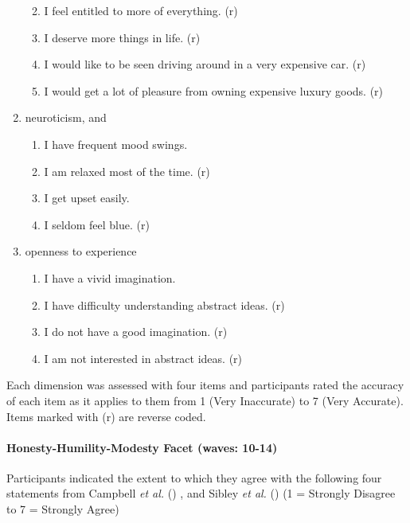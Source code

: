 \documentclass[
  singlecolumn]{article}
\let\oldparagraph\paragraph
\renewcommand{\paragraph}[1]{\oldparagraph{#1}\mbox{}}
\providecommand{\tightlist}{%
  \setlength{\itemsep}{0pt}\setlength{\parskip}{0pt}}\usepackage{longtable,booktabs,array}
\begin{document}
\begin{enumerate}
  \begin{enumerate}
  \def\labelenumii{\roman{enumii}.}
  \tightlist
  \item
    I feel entitled to more of everything. (r)
  \item
    I deserve more things in life. (r)
  \item
    I would like to be seen driving around in a very expensive car. (r)
  \item
    I would get a lot of pleasure from owning expensive luxury goods.
    (r)
  \end{enumerate}
\item
  neuroticism, and

  \begin{enumerate}
  \def\labelenumii{\roman{enumii}.}
  \tightlist
  \item
    I have frequent mood swings.
  \item
    I am relaxed most of the time. (r)
  \item
    I get upset easily.
  \item
    I seldom feel blue. (r)
  \end{enumerate}
\item
  openness to experience

  \begin{enumerate}
  \def\labelenumii{\roman{enumii}.}
  \tightlist
  \item
    I have a vivid imagination.
  \item
    I have difficulty understanding abstract ideas. (r)
  \item
    I do not have a good imagination. (r)
  \item
    I am not interested in abstract ideas. (r)
  \end{enumerate}
\end{enumerate}

Each dimension was assessed with four items and participants rated the
accuracy of each item as it applies to them from 1 (Very Inaccurate) to
7 (Very Accurate). Items marked with (r) are reverse coded.

\paragraph{Honesty-Humility-Modesty Facet (waves:
10-14)}\label{honesty-humility-modesty-facet-waves-10-14}

Participants indicated the extent to which they agree with the following
four statements from Campbell \emph{et al.}
() , and Sibley \emph{et al.}
() (1 = Strongly Disagree to 7 = Strongly
Agree)
\end{document}
